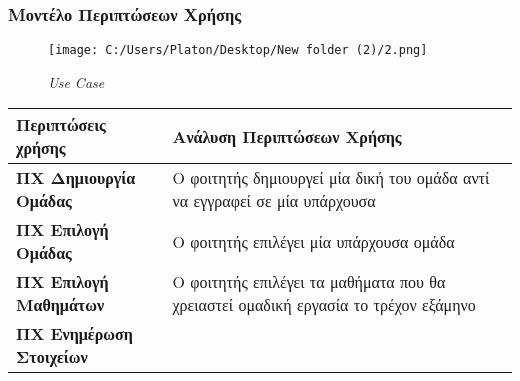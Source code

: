\documentclass[
]{article}
\begin{document}
\hypertarget{ux3bcux3bfux3bdux3c4ux3adux3bbux3bf-ux3c0ux3b5ux3c1ux3b9ux3c0ux3c4ux3ceux3c3ux3b5ux3c9ux3bd-ux3c7ux3c1ux3aeux3c3ux3b7ux3c2}{%
\subsubsection{Μοντέλο Περιπτώσεων
Χρήσης}\label{ux3bcux3bfux3bdux3c4ux3adux3bbux3bf-ux3c0ux3b5ux3c1ux3b9ux3c0ux3c4ux3ceux3c3ux3b5ux3c9ux3bd-ux3c7ux3c1ux3aeux3c3ux3b7ux3c2}}

\begin{figure}
\centering
\texttt{[image: C:/Users/Platon/Desktop/New folder (2)/2.png]}
\caption{\emph{Use Case}}
\end{figure}

\begin{longtable}[]{@{}ll@{}}
\toprule
\begin{minipage}[b]{0.35\columnwidth}\raggedright
Περιπτώσεις χρήσης\strut
\end{minipage} & \begin{minipage}[b]{0.59\columnwidth}\raggedright
Ανάλυση Περιπτώσεων Χρήσης\strut
\end{minipage}\tabularnewline
\midrule
\endhead
\begin{minipage}[t]{0.35\columnwidth}\raggedright
\textbf{ΠΧ Δημιουργία Ομάδας}\strut
\end{minipage} & \begin{minipage}[t]{0.59\columnwidth}\raggedright
Ο φοιτητής δημιουργεί μία δική του ομάδα αντί να εγγραφεί σε μία
υπάρχουσα\strut
\end{minipage}\tabularnewline
\begin{minipage}[t]{0.35\columnwidth}\raggedright
\textbf{ΠΧ Επιλογή Ομάδας}\strut
\end{minipage} & \begin{minipage}[t]{0.59\columnwidth}\raggedright
Ο φοιτητής επιλέγει μία υπάρχουσα ομάδα\strut
\end{minipage}\tabularnewline
\begin{minipage}[t]{0.35\columnwidth}\raggedright
\textbf{ΠΧ Επιλογή Μαθημάτων}\strut
\end{minipage} & \begin{minipage}[t]{0.59\columnwidth}\raggedright
Ο φοιτητής επιλέγει τα μαθήματα που θα χρειαστεί ομαδική εργασία το
τρέχον εξάμηνο\strut
\end{minipage}\tabularnewline
\begin{minipage}[t]{0.35\columnwidth}\raggedright
\textbf{ΠΧ Ενημέρωση Στοιχείων}\strut
\end{minipage} & \begin{minipage}[t]{0.59\columnwidth}\raggedright

\end{minipage}
\end{longtable}
\end{document}
